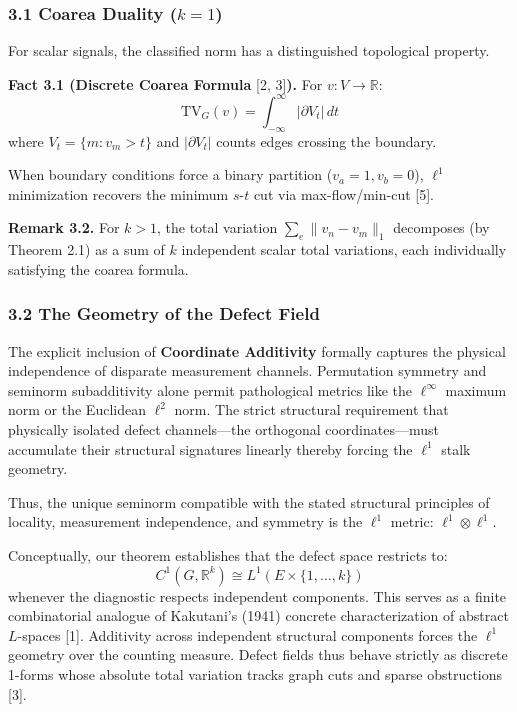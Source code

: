 \documentclass[
]{amsart}
\begin{document}
\hypertarget{coarea-duality-k-1}{%
\subsubsection{\texorpdfstring{3.1 Coarea Duality
(\(k = 1\))}{3.1 Coarea Duality (k = 1)}}\label{coarea-duality-k-1}}

For scalar signals, the classified norm has a distinguished topological
property.

\textbf{Fact 3.1 (Discrete Coarea Formula} {[}2, 3{]}\textbf{).} For
\(v: V \to \mathbb{R}\):
\[ \text{TV}_G(v) = \int_{-\infty}^{\infty} |\partial V_t| \, dt \]
where \(V_t = \{m : v_m > t\}\) and \(|\partial V_t|\) counts edges
crossing the boundary.

When boundary conditions force a binary partition
(\(v_a = 1, v_b = 0\)), \(\ell^1\) minimization recovers the minimum
\(s\)-\(t\) cut via max-flow/min-cut {[}5{]}.

\textbf{Remark 3.2.} For \(k > 1\), the total variation
\(\sum_e \|v_n - v_m\|_1\) decomposes (by Theorem 2.1) as a sum of \(k\)
independent scalar total variations, each individually satisfying the
coarea formula.

\hypertarget{the-geometry-of-the-defect-field}{%
\subsubsection{3.2 The Geometry of the Defect
Field}\label{the-geometry-of-the-defect-field}}

The explicit inclusion of \textbf{Coordinate Additivity} formally
captures the physical independence of disparate measurement channels.
Permutation symmetry and seminorm subadditivity alone permit
pathological metrics like the \(\ell^\infty\) maximum norm or the
Euclidean \(\ell^2\) norm. The strict structural requirement that
physically isolated defect channels---the orthogonal coordinates---must
accumulate their structural signatures linearly thereby forcing the
\(\ell^1\) stalk geometry.

Thus, the unique seminorm compatible with the stated structural
principles of locality, measurement independence, and symmetry is the
\(\ell^1\) metric: \(\ell^1 \otimes \ell^1\).

Conceptually, our theorem establishes that the defect space restricts
to: \[ C^1(G,\mathbb{R}^k) \cong L^1(E \times \{1,\dots,k\}) \] whenever
the diagnostic respects independent components. This serves as a finite
combinatorial analogue of Kakutani's (1941) concrete characterization of
abstract \(L\)-spaces {[}1{]}. Additivity across independent structural
components forces the \(\ell^1\) geometry over the counting measure.
Defect fields thus behave strictly as discrete 1-forms whose absolute
total variation tracks graph cuts and sparse obstructions {[}3{]}.
\end{document}
